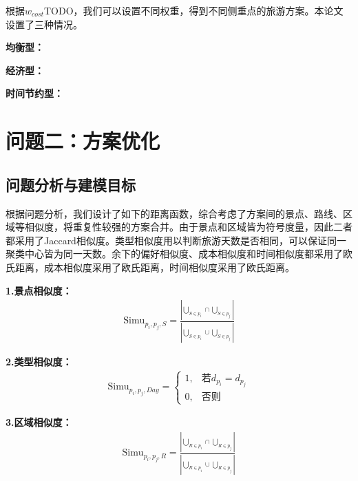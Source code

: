根据$w_{cost}$TODO，我们可以设置不同权重，得到不同侧重点的旅游方案。本论文设置了三种情况。

\textbf{均衡型：}

\textbf{经济型：}

\textbf{时间节约型：}



\section[\hspace{-2pt}问题二：方案优化]{{\heiti{} \hspace{-8pt}问题二：方案优化}}\label{section3: 问题2：方案优化}

\subsection[\hspace{-2pt}问题分析与建模目标]{{\heiti{} \hspace{-8pt}问题分析与建模目标}}\label{section2: 问题分析与建模目标}

根据问题分析，我们设计了如下的距离函数，综合考虑了方案间的景点、路线、区域等相似度，将重复性较强的方案合并。由于景点和区域皆为符号度量，因此二者都采用了Jaccard相似度。类型相似度用以判断旅游天数是否相同，可以保证同一聚类中心皆为同一天数。余下的偏好相似度、成本相似度和时间相似度都采用了欧氏距离，成本相似度采用了欧氏距离，时间相似度采用了欧氏距离。

\noindent\textbf{1.景点相似度：}
\begin{equation}
  \begin{aligned}
    \text{Simu}_{p_{i},p_{j},S} = \frac{|\underset{S\in p_i}{\bigcup}\cap \underset{S\in p_j}{\bigcup}|}{|\underset{S\in p_i}{\bigcup}\cup \underset{S\in p_j}{\bigcup}|}
  \end{aligned}
\end{equation}

\noindent\textbf{2.类型相似度：}
\begin{equation}
  \begin{aligned}
    \text{Simu}_{p_{i},p_{j},Day} = \begin{cases}
      1, & \text{若}d_{p_i}=d_{p_j}\\
      0, & \text{否则}
    \end{cases}
  \end{aligned}
\end{equation}

\noindent\textbf{3.区域相似度：}
\begin{equation}
  \begin{aligned}
    \text{Simu}_{p_{i},p_{j},R} = \frac{|\underset{R\in p_i}{\bigcup}\cap \underset{R\in p_j}{\bigcup}|}{|\underset{R\in p_i}{\bigcup}\cup \underset{R\in p_j}{\bigcup}|}
  \end{aligned}
\end{equation}

